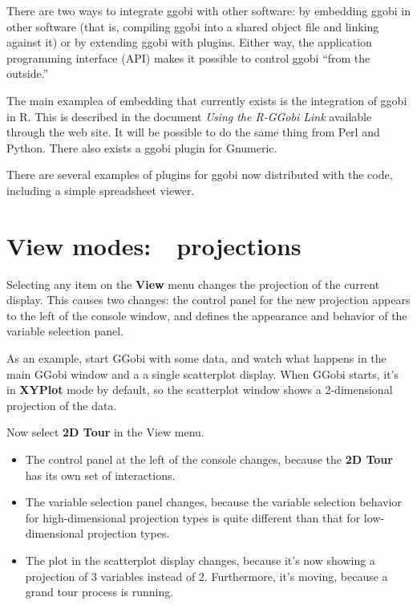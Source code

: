 \documentclass[11pt]{article}
\def\Widget#1{\textbf{#1}}
\begin{document}
There are two ways to integrate ggobi with other software: by embedding
ggobi in other software (that is, compiling ggobi into a shared object
file and linking against it) or by extending ggobi with plugins.  Either
way, the application programming interface (API) makes it possible to
control ggobi ``from the outside.''

The main examplea of embedding that currently exists is the integration
of ggobi in R. This is described in the document {\em Using the R-GGobi
Link} available through the web site.   It will be possible to do the
same thing from Perl and Python.  There also exists a ggobi plugin
for Gnumeric.

There are several examples of plugins for ggobi now distributed with
the code, including a simple spreadsheet viewer.

\section{View modes:~~projections}
\label{slbl:ViewModes}

Selecting any item on the \Widget{View} menu changes the projection of
the current display.  This causes two changes: the control panel for
the new projection appears to the left of the console window, and
defines the appearance and behavior of the variable selection panel.

As an example, start GGobi with some data, and watch what happens in
the main GGobi window and a a single scatterplot display.   When
GGobi starts, it's in \Widget{XYPlot} mode by default, so the
scatterplot window shows a 2-dimensional projection of the data. 

Now select \Widget{2D Tour} in the View menu.  

\begin{itemize}
\itemsep 0em
\item The control panel at the left of the console changes, because
      the \Widget{2D Tour} has its own set of interactions.
\item The variable selection panel changes, because the variable
      selection behavior for high-dimensional projection types is
      quite different than that for low-dimensional projection types.
\item The plot in the scatterplot display changes, because it's
      now showing a projection of 3 variables instead of 2.  Furthermore,
      it's moving, because a grand tour process is running.
\end{itemize}
\end{document}
